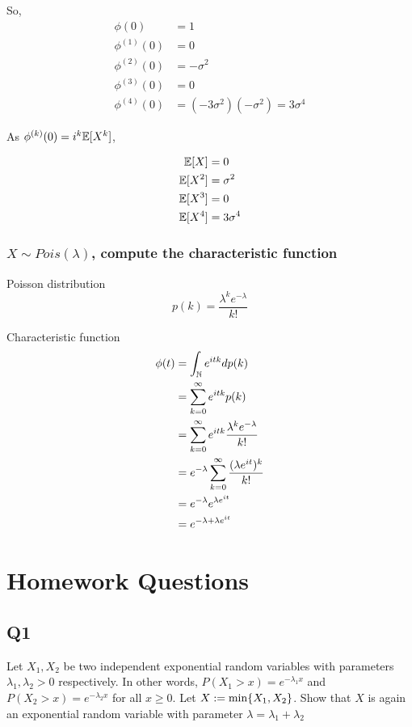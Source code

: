 \documentclass{article}
\begin{document}
So,
\begin{align*}
    \phi(0) &= 1 \\
    \phi^{(1)}(0) &= 0 \\
    \phi^{(2)}(0) &= -\sigma^2 \\
    \phi^{(3)}(0) &= 0 \\
    \phi^{(4)}(0) &= (-3 \sigma^2)(-\sigma^2) = 3 \sigma^4
\end{align*}

As $\phi^{(k)}(0) = i^k \mathbb{E}[X^k]$, 

\begin{align*}
    \mathbb{E}[X] &= 0 \\
    \mathbb{E}[X^2] &= \sigma^2 \\
    \mathbb{E}[X^3] &= 0 \\
    \mathbb{E}[X^4] &= 3 \sigma^4 \\
\end{align*}


\subsubsection{$X \sim Pois(\lambda)$, compute the characteristic function}

Poisson distribution
$$
    p(k) = \frac{\lambda^k e^{-\lambda}}{k!}
$$

Characteristic function
\begin{align*}
    \phi(t)
    &= \int_{\mathbb{N}} e^{itk} d p(k) \\
    &= \sum_{k=0}^\infty e^{itk} p(k) \\
    &= \sum_{k=0}^\infty e^{itk} \frac{\lambda^k e^{-\lambda}}{k!} \\
    &= e^{-\lambda} \sum_{k=0}^\infty \frac{(\lambda e^{it} )^k}{k!} \\
    &= e^{-\lambda} e^{\lambda e^{it}} \\
    &= e^{- \lambda + \lambda e^{it}}
\end{align*}


\section{Homework Questions}

\subsection{Q1}
Let $X_1, X_2$ be two independent exponential random variables with parameters $\lambda_1, \lambda_2 > 0$ respectively. In other words, $P(X_1 > x) = e^{- \lambda_1 x}$ and $P(X_2 > x) = e^{-\lambda_2 x}$ for all $x \geq 0$. Let $X := \min \{X_1, X_2\}$. Show that $X$ is again an exponential random variable with parameter $\lambda = \lambda_1 + \lambda_2$
\end{document}
